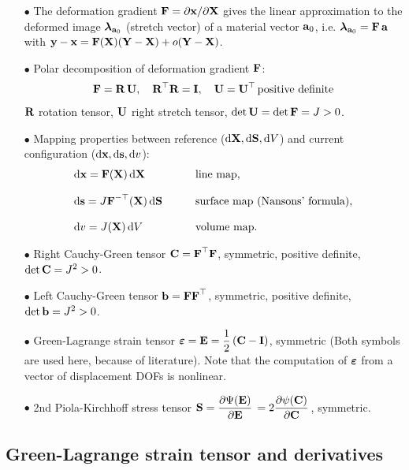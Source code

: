 \begin{itemize}
\item[$\bullet$] The deformation gradient $\textbf{F} = \partial{\textbf{x}}/\partial{\textbf{X}}$ gives the linear approximation to the deformed image $\boldsymbol{\lambda}_{\textbf{a}_0}$ (stretch vector) of a material vector $\textbf{a}_0$, i.e. $\boldsymbol{\lambda}_{\textbf{a}_0} = \textbf{F}\,\textbf{a}$ with $\textbf{y} - \textbf{x} = \textbf{F}(\textbf{X})(\textbf{Y}-\textbf{X}) + o(\textbf{Y}-\textbf{X})$.
\item[$\bullet$] Polar decomposition of deformation gradient $\textbf{F}$:
\begin{equation*}
  \begin{array}{lll}
    \textbf{F} = \textbf{R}\,\textbf{U}, \quad \textbf{R}^\top\textbf{R} = \textbf{I}, \quad \textbf{U} = \textbf{U}^\top \,\text{positive definite}
  \end{array}
\end{equation*}
$\textbf{R}$ rotation tensor, $\textbf{U}$ right stretch tensor, $\hbox{det} \, \textbf{U} = \hbox{det} \, \textbf{F} = J > 0$.
%
\item[$\bullet$] Mapping properties between reference ($\d\bfX, \d\bfS, \d V$) and current configuration ($\d\bfx, \d\bfs, \d v$):
\begin{equation*}
  \begin{array}{lll}
    \d\bfx = \bfF(\bfX)\,\d\bfX \qquad &\text{line map,}\\[4mm]
    \d\bfs = J\bfF^{-\top}(\bfX)\,\d\bfS \qquad & \text{surface map (Nansons' formula),}\\[4mm]
    \d v = J(\bfX)\,\d V \qquad & \text{volume map.}
  \end{array}
\end{equation*}
%
\item[$\bullet$] Right Cauchy-Green tensor $\textbf{C} = \textbf{F}^\top \textbf{F}$, symmetric, positive definite, $\hbox{det} \, \textbf{C} = J^2 > 0$.
\item[$\bullet$] Left Cauchy-Green tensor $\textbf{b} = \textbf{F}\textbf{F}^\top$, symmetric, positive definite, $\hbox{det} \, \textbf{b} = J^2 > 0$.
\item[$\bullet$] Green-Lagrange strain tensor $\boldsymbol{\varepsilon} = \textbf{E} =\displaystyle\frac{\displaystyle{1}}{\displaystyle{2}}\,(\textbf{C} - \textbf{I})$, symmetric (Both symbols are used here, because of literature). Note that the computation of $\boldsymbol{\varepsilon}$ from a vector of displacement DOFs is nonlinear.
\item[$\bullet$] 2nd Piola-Kirchhoff stress tensor $\bfS = \p{\Psi(\bfE)}{\bfE} = 2\p{\psi(\bfC)}{\bfC}$, symmetric.
\end{itemize}

\subsection{Green-Lagrange strain tensor and derivatives}

